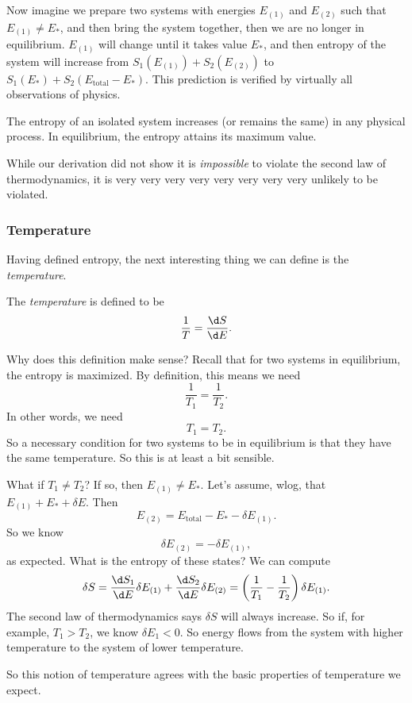 \documentclass[a4paper]{article}
\begin{document}
Now imagine we prepare two systems with energies $E_{(1)}$ and $E_{(2)}$ such that $E_{(1)} \not= E_*$, and then bring the system together, then we are no longer in equilibrium. $E_{(1)}$ will change until it takes value $E_*$, and then entropy of the system will increase from $S_1(E_{(1)}) + S_2(E_{(2)})$ to $S_1(E_*) + S_2(E_{\mathrm{total}} - E_*)$. This prediction is verified by virtually all observations of physics.
\begin{law}
  The entropy of an isolated system increases (or remains the same) in any physical process. In equilibrium, the entropy attains its maximum value.
\end{law}
While our derivation did not show it is \emph{impossible} to violate the second law of thermodynamics, it is very very very very very very very very unlikely to be violated.

\subsubsection*{Temperature}
Having defined entropy, the next interesting thing we can define is the \emph{temperature}.
\begin{defi}[Temperature]
  The \emph{temperature} is defined to be
  \[
    \frac{1}{T} = \frac{\d S}{\d E}.
  \]
\end{defi}
Why does this definition make sense? Recall that for two systems in equilibrium, the entropy is maximized. By definition, this means we need
\[
  \frac{1}{T_1} = \frac{1}{T_2}.
\]
In other words, we need
\[
  T_1 = T_2.
\]
So a necessary condition for two systems to be in equilibrium is that they have the same temperature. So this is at least a bit sensible.

What if $T_1 \not= T_2$? If so, then $E_{(1)} \not= E_*$. Let's assume, wlog, that $E_{(1)} + E_* + \delta E$. Then
\[
  E_{(2)} = E_{\mathrm{total}} - E_{*} - \delta E_{(1)}.
\]
So we know
\[
  \delta E_{(2)} = - \delta E_{(1)},
\]
as expected. What is the entropy of these states? We can compute
\[
  \delta S = \frac{\d S_1}{\d E} \delta E_{(1)} + \frac{\d S_2}{\d E} \delta E_{(2)} = \left(\frac{1}{T_1} - \frac{1}{T_2}\right) \delta E_{(1)}.
\]
The second law of thermodynamics says $\delta S$ will always increase. So if, for example, $T_1 > T_2$, we know $\delta E_1 < 0$. So energy flows from the system with higher temperature to the system of lower temperature.

So this notion of temperature agrees with the basic properties of temperature we expect.
\end{document}
